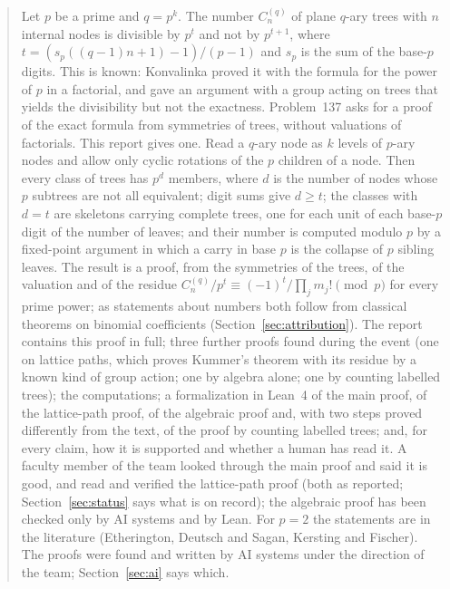 \documentclass[11pt]{article}
\theoremstyle{definition}
\theoremstyle{remark}
\numberwithin{equation}{section}
\numberwithin{figure}{section}
\begin{document}
\begin{abstract}
Let $p$ be a prime and $q=p^k$. The number $C_n^{(q)}$ of plane $q$-ary trees with $n$ internal nodes is
divisible by $p^t$ and not by $p^{t+1}$, where $t=(s_p((q-1)n+1)-1)/(p-1)$ and $s_p$ is the sum of the base-$p$
digits. This is known: Konvalinka proved it with the formula for the power of $p$ in a factorial, and gave an
argument with a group acting on trees that yields the divisibility but not the exactness. Problem~137 asks for
a proof of the exact formula from symmetries of trees, without valuations of factorials. This report gives
one. Read a $q$-ary node as $k$ levels of $p$-ary nodes and allow only cyclic rotations of the $p$ children of
a node. Then every class of trees has $p^d$ members, where $d$ is the number of nodes whose $p$ subtrees are
not all equivalent; digit sums give $d\ge t$; the classes with $d=t$ are skeletons carrying complete trees,
one for each unit of each base-$p$ digit of the number of leaves; and their number is computed modulo $p$ by a
fixed-point argument in which a carry in base $p$ is the collapse of $p$ sibling leaves. The result is a
proof, from the symmetries of the trees, of the valuation and of the residue
$C_n^{(q)}/p^t\equiv(-1)^t/\prod_jm_j!\pmod p$ for every prime power; as statements about numbers both follow
from classical theorems on binomial coefficients (Section~\ref{sec:attribution}). The report
contains this proof in full; three further proofs found during the event (one on lattice paths, which proves
Kummer's theorem with its residue by a known kind of group action; one by algebra alone; one by counting
labelled trees); the computations; a formalization in Lean~4 of the main proof, of the lattice-path proof, of
the algebraic proof and, with two steps proved differently from the text, of the proof by counting labelled
trees; and, for every claim, how it is supported and whether a human has read it. A faculty
member of the team looked through the main proof and said it is good, and read and verified the lattice-path
proof (both as reported; Section~\ref{sec:status} says what is on record); the algebraic proof has been checked
only by AI systems and by Lean. For $p=2$ the statements are in the literature (Etherington, Deutsch and Sagan, Kersting
and Fischer). The proofs were found and written by AI systems under the direction of the team; Section~\ref{sec:ai} says which.
\end{abstract}

\clearpage
\end{document}
